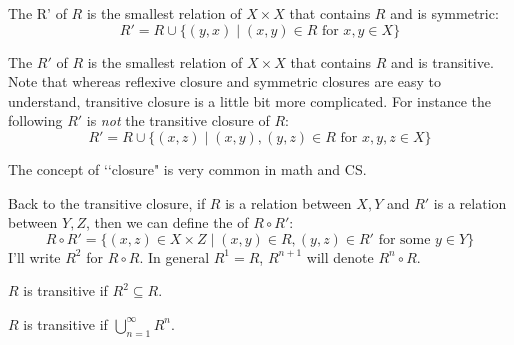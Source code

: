 The  R' of $R$ is the smallest relation
of $X \times X$ that contains $R$ and is symmetric:
\[
R' = R \cup \{(y, x) \mid (x, y) \in R \text{ for } x,y \in X\}
\]

The  $R'$ of $R$ is the smallest relation
of $X \times X$ that contains $R$ and is transitive.
Note that whereas reflexive closure and symmetric closures are easy to
understand,
transitive closure is a little bit more complicated.
For instance the following $R'$ is \textit{not} the transitive closure of $R$:
\[
R' = R \cup \{(x, z) \mid (x, y), (y, z) \in R \text{ for } x,y,z \in X\}
\]



The concept of \lq\lq closure" is very common in math and CS.

Back to the transitive closure, if $R$ is a relation between
$X, Y$ and $R'$ is a relation between $Y, Z$,
then we can define the  of $R \circ R'$:
\[
R \circ R' =
\{
(x, z) \in X \times Z \mid (x, y) \in R, (y, z) \in R' \text{ for some }
y \in Y
\}
\]
I'll write $R^2$ for $R \circ R$.
In general $R^1 = R$, $R^{n+1}$ will denote $R^n \circ R$.

\begin{prop}
  $R$ is transitive if $R^2 \subseteq R$.
\end{prop}

\begin{prop}
  $R$ is transitive if $\bigcup_{n = 1}^\infty R^n$.
\end{prop}
